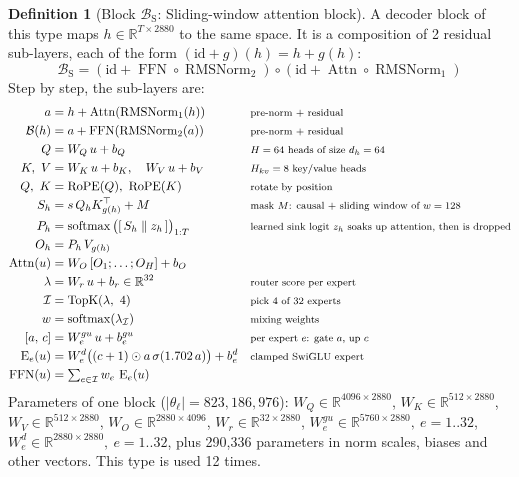 \documentclass[10pt,a4paper]{article}
\newcommand{\op}[1]{\operatorname{#1}}
\theoremstyle{definition}
\newtheorem{definition}{Definition}[section]
\begin{document}
\begin{definition}[Block $\mathcal{B}_{\mathrm{S}}$: Sliding-window attention block]
A decoder block of this type maps $h\in\mathbb{R}^{T\times 2880}$ to the same space. It is a composition of 2 residual sub-layers, each of the form $(\mathrm{id}+g)(h)=h+g(h)$:
\begin{equation}
  \mathcal{B}_{\mathrm{S}} = (\mathrm{id}+\op{FFN}\circ \op{RMSNorm}_{2})\circ(\mathrm{id}+\op{Attn}\circ \op{RMSNorm}_{1})
\end{equation}
Step by step, the sub-layers are:
\begin{align*}
  a &= h + \op{Attn}(\op{RMSNorm}_{1}(h)) && \text{\footnotesize pre-norm + residual} \\
  \mathcal{B}(h) &= a + \op{FFN}(\op{RMSNorm}_{2}(a)) && \text{\footnotesize pre-norm + residual} \\
  Q &= W_Q\,u + b_{Q} && \text{\footnotesize $H=64$ heads of size $d_h=64$} \\
  K,\ V &= W_K\,u + b_{K},\quad W_V\,u + b_{V} && \text{\footnotesize $H_{kv}=8$ key/value heads} \\
  Q,\ K &= \op{RoPE}(Q),\ \op{RoPE}(K) && \text{\footnotesize rotate by position} \\
  S_h &= s\, Q_h K_{g(h)}^{\top} + M && \text{\footnotesize mask $M$: causal + sliding window of $w=128$} \\
  P_h &= \op{softmax}\big([\,S_h \;\|\; z_h\,]\big)_{1:T} && \text{\footnotesize learned sink logit $z_h$ soaks up attention, then is dropped} \\
  O_h &= P_h\, V_{g(h)} \\
  \op{Attn}(u) &= W_O\,[O_1;\dots;O_H] + b_O \\
  \lambda &= W_r\,u + b_r \in \mathbb{R}^{32} && \text{\footnotesize router score per expert} \\
  \mathcal{I} &= \op{TopK}(\lambda,\ 4) && \text{\footnotesize pick 4 of 32 experts} \\
  w &= \op{softmax}(\lambda_{\mathcal{I}}) && \text{\footnotesize mixing weights} \\
  [a,\,c] &= W^{gu}_e\,u + b^{gu}_e && \text{\footnotesize per expert $e$: gate $a$, up $c$} \\
  \op{E}_e(u) &= W^{d}_e\big((c+1)\odot a\,\sigma(1.702\,a)\big) + b^{d}_e && \text{\footnotesize clamped SwiGLU expert} \\
  \op{FFN}(u) &= \textstyle\sum_{e\in\mathcal{I}} w_e\,\op{E}_e(u)
\end{align*}
Parameters of one block ($|\theta_\ell|=823{,}186{,}976$): $W_Q\in\mathbb{R}^{4096\times2880}$, $W_K\in\mathbb{R}^{512\times2880}$, $W_V\in\mathbb{R}^{512\times2880}$, $W_O\in\mathbb{R}^{2880\times4096}$, $W_r\in\mathbb{R}^{32\times2880}$, $W^{gu}_e\in\mathbb{R}^{5760\times2880},\ e=1..{32}$, $W^{d}_e\in\mathbb{R}^{2880\times2880},\ e=1..{32}$, plus 290,336 parameters in norm scales, biases and other vectors. This type is used 12 times.
\end{definition}
\end{document}
